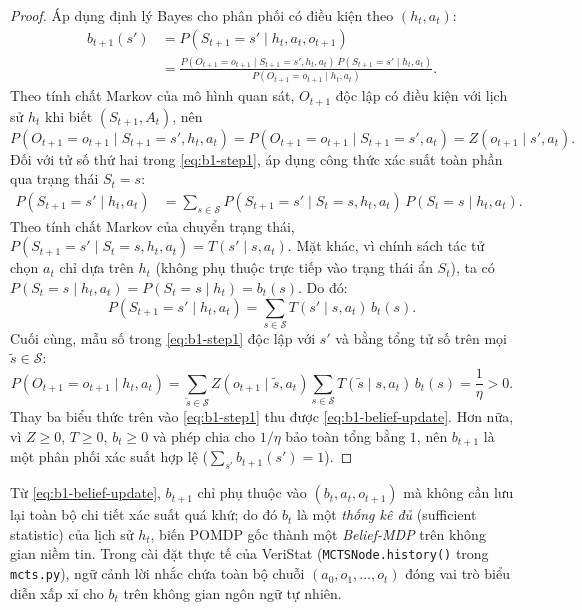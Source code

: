 \begin{proof}
Áp dụng định lý Bayes cho phân phối có điều kiện theo $(h_t, a_t)$:
\begin{align}
  b_{t+1}(s')
  &= P(S_{t+1} = s' \mid h_t, a_t, o_{t+1}) \nonumber \\
  &= \frac{P(O_{t+1} = o_{t+1} \mid S_{t+1} = s', h_t, a_t) \, P(S_{t+1} = s' \mid h_t, a_t)}{P(O_{t+1} = o_{t+1} \mid h_t, a_t)}.
  \label{eq:b1-step1}
\end{align}
Theo tính chất Markov của mô hình quan sát, $O_{t+1}$ độc lập có điều kiện với lịch sử $h_t$ khi biết $(S_{t+1}, A_t)$, nên
\[
  P(O_{t+1} = o_{t+1} \mid S_{t+1} = s', h_t, a_t) = P(O_{t+1} = o_{t+1} \mid S_{t+1} = s', a_t) = Z(o_{t+1} \mid s', a_t).
\]
Đối với tử số thứ hai trong \eqref{eq:b1-step1}, áp dụng công thức xác suất toàn phần qua trạng thái $S_t = s$:
\begin{align*}
  P(S_{t+1} = s' \mid h_t, a_t)
  &= \sum_{s \in \mathcal{S}} P(S_{t+1} = s' \mid S_t = s, h_t, a_t) \, P(S_t = s \mid h_t, a_t).
\end{align*}
Theo tính chất Markov của chuyển trạng thái, $P(S_{t+1} = s' \mid S_t = s, h_t, a_t) = T(s' \mid s, a_t)$. Mặt khác, vì chính sách tác tử chọn $a_t$ chỉ dựa trên $h_t$ (không phụ thuộc trực tiếp vào trạng thái ẩn $S_t$), ta có $P(S_t = s \mid h_t, a_t) = P(S_t = s \mid h_t) = b_t(s)$. Do đó:
\[
  P(S_{t+1} = s' \mid h_t, a_t) = \sum_{s \in \mathcal{S}} T(s' \mid s, a_t) \, b_t(s).
\]
Cuối cùng, mẫu số trong \eqref{eq:b1-step1} độc lập với $s'$ và bằng tổng tử số trên mọi $\tilde{s} \in \mathcal{S}$:
\[
  P(O_{t+1} = o_{t+1} \mid h_t, a_t) = \sum_{\tilde{s} \in \mathcal{S}} Z(o_{t+1} \mid \tilde{s}, a_t) \sum_{s \in \mathcal{S}} T(\tilde{s} \mid s, a_t) \, b_t(s) = \frac{1}{\eta} > 0.
\]
Thay ba biểu thức trên vào \eqref{eq:b1-step1} thu được \eqref{eq:b1-belief-update}. Hơn nữa, vì $Z \ge 0$, $T \ge 0$, $b_t \ge 0$ và phép chia cho $1/\eta$ bảo toàn tổng bằng $1$, nên $b_{t+1}$ là một phân phối xác suất hợp lệ ($\sum_{s'} b_{t+1}(s') = 1$).
\end{proof}

\begin{remark}
Từ \eqref{eq:b1-belief-update}, $b_{t+1}$ chỉ phụ thuộc vào $(b_t, a_t, o_{t+1})$ mà không cần lưu lại toàn bộ chi tiết xác suất quá khứ; do đó $b_t$ là một \emph{thống kê đủ} (sufficient statistic) của lịch sử $h_t$, biến POMDP gốc thành một \emph{Belief-MDP} trên không gian niềm tin. Trong cài đặt thực tế của VeriStat (\texttt{MCTSNode.history()} trong \texttt{mcts.py}), ngữ cảnh lời nhắc chứa toàn bộ chuỗi $(a_0, o_1, \dots, o_t)$ đóng vai trò biểu diễn xấp xỉ cho $b_t$ trên không gian ngôn ngữ tự nhiên.
\end{remark}

